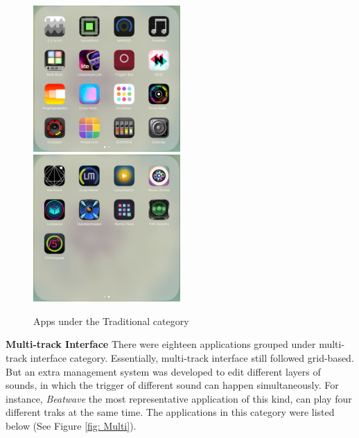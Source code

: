 \bigskip
\begin{figure}[h]
  \includegraphics[width=0.50\textwidth]{images/Traditional1.png}
  \includegraphics[width=0.50\textwidth]{images/Traditional2.png}
  \caption{Apps under the Traditional category}
  \label{fig: Traditional}
\end{figure}
\bigskip

\textbf{Multi-track Interface} There were eighteen applications grouped under multi-track interface category. Essentially, multi-track interface still followed grid-based. But an extra management system was developed to edit different layers of sounds, in which the trigger of different sound can happen simultaneously. For instance, \textit{Beatwave} the most representative application of this kind, can play four different traks at the same time. The applications in this category were listed below (See Figure \ref{fig: Multi}).

